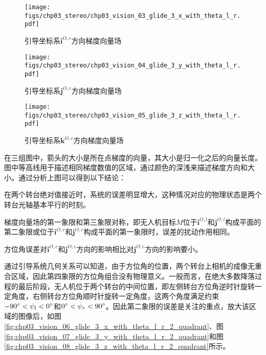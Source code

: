 \begin{figure}[!tb]
	\centering
	\texttt{[image: figs/chp03\_stereo/chp03\_vision\_03\_glide\_3\_x\_with\_theta\_l\_r.pdf]}	
	\caption{引导坐标系$\mathbf{i}^{O,c}$方向梯度向量场}
	\label{fig:chp03_vision_03_glide_3_x_with_theta_l_r}
\end{figure}

\begin{figure}[!tb]
	\centering
	\texttt{[image: figs/chp03\_stereo/chp03\_vision\_04\_glide\_3\_y\_with\_theta\_l\_r.pdf]}	
	\caption{引导坐标系$\mathbf{j}^{O,c}$方向梯度向量场}
	\label{fig:chp03_vision_04_glide_3_y_with_theta_l_r}
\end{figure}

\begin{figure}[!tb]
	\centering
	\texttt{[image: figs/chp03\_stereo/chp03\_vision\_05\_glide\_3\_z\_with\_theta\_l\_r.pdf]}	
	\caption{引导坐标系$\mathbf{k}^{O,c}$方向梯度向量场}
	\label{fig:chp03_vision_05_glide_3_z_with_theta_l_r}
\end{figure}

在三组图中，箭头的大小是所在点梯度的向量，其大小是归一化之后的向量长度。图中等高线用于描述相同梯度数值的区域，通过颜色的深浅来描述梯度方向和大小。通过分析上图可以得到以下结论：
\begin{compactenum}
\item
在两个转台绝对值接近时，系统的误差明显增大，这种情况对应的物理状态是两个转台光轴基本平行的时刻。
\item
梯度向量场的第一象限和第三象限对称，即无人机目标$M$位于$\mathbf{i}^{O,l}$和$\mathbf{j}^{O,l}$构成平面的第二象限或位于$\mathbf{i}^{O,r}$和$\mathbf{j}^{O,r}$构成平面的第一象限时，误差的扰动作用相同。
\item
方位角误差对$\mathbf{i}^{O,c}$和$\mathbf{j}^{O,c}$方向的影响相比对$\mathbf{j}^{O,c}$方向的影响要小。
\end{compactenum}
 

通过引导系统几何关系可以知道，由于方位角的位置，两个转台上相机的成像无重合区域，因此第四象限的方位角组合没有物理意义。一般而言，在绝大多数降落过程的最后阶段，无人机位于两个转台的中间位置，即左侧转台方位角逆时针旋转一定角度，右侧转台方位角顺时针旋转一定角度，这两个角度满足约束
$ -90\degree < \psi_l < 0\degree$和$ 0\degree < \psi_r < 90\degree$。因此第二象限的误差是关注的重点，放大该区域的图像后，如图\ref{fig:chp03_vision_06_glide_3_x_with_theta_l_r_2_quadrant}、图\ref{fig:chp03_vision_07_glide_3_y_with_theta_l_r_2_quadrant}和图\ref{fig:chp03_vision_08_glide_3_z_with_theta_l_r_2_quadrant}所示。

